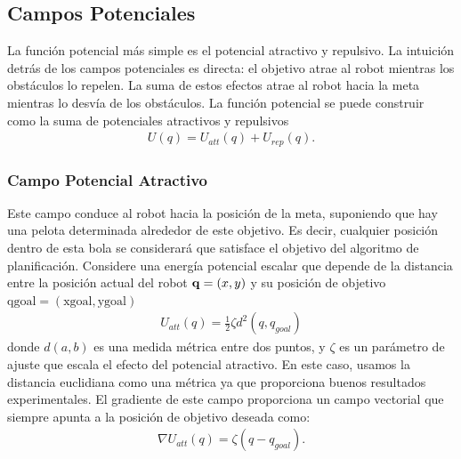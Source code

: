 \subsection{Campos Potenciales}
La funci\'on potencial m\'as simple es el potencial atractivo y repulsivo. La 
intuici\'on detr\'as de los campos potenciales es directa: el objetivo atrae al 
robot mientras los obst\'aculos lo repelen. La suma de estos efectos atrae al 
robot hacia la meta mientras lo desvía de los obst\'aculos. La funci\'on 
potencial se puede construir como la suma de potenciales atractivos y repulsivos
\begin{align}
\label{eqn:potetialField}
U(q) = U_{att}(q) + U_{rep}(q).
\end{align}
\subsubsection{Campo Potencial Atractivo}
Este campo conduce al robot hacia la posici\'on de la meta, suponiendo que 
hay una pelota determinada alrededor de este objetivo. Es decir, cualquier 
posici\'on dentro de esta bola se considerar\'a que satisface el objetivo 
del algoritmo de planificaci\'on. Considere una energ\'ia potencial escalar 
que depende de la distancia entre la posici\'on actual del robot $\mathbf q=(x,y)$ y 
su posici\'on de objetivo $\text{qgoal}=(\text{xgoal},\text{ygoal})$
\begin{align}
\label{eqn:pot_attr}
U_{att}(q) = \frac{1}{2}\zeta d^{2} (q,q_{goal})
\end{align}
donde $d(a,b)$ es una medida m\'etrica entre dos puntos, y $\zeta$ es un 
par\'ametro de ajuste que escala el efecto del potencial atractivo. En este 
caso, usamos la distancia euclidiana como una m\'etrica ya que proporciona 
buenos resultados experimentales. El gradiente de este campo proporciona un 
campo vectorial que siempre apunta a la posici\'on de objetivo deseada como:
\begin{align}
\label{eqn:gradient_att}
\nabla U_{att}(q)=\zeta(q-q_{goal}).
\end{align}

